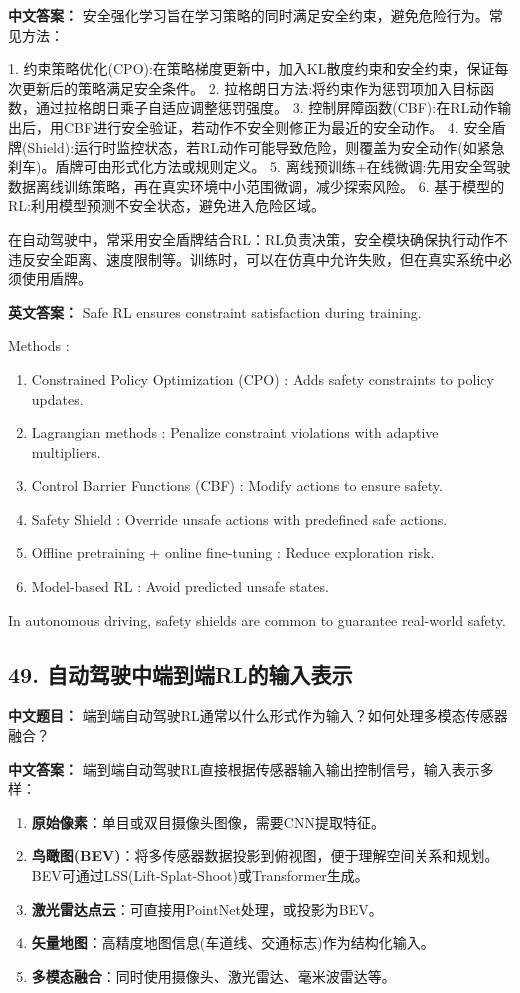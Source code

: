 \documentclass[10pt,a4paper]{ctexart}
\begin{document}
\textbf{中文答案：}  
安全强化学习旨在学习策略的同时满足安全约束，避免危险行为。常见方法：

1.  约束策略优化(CPO):在策略梯度更新中，加入KL散度约束和安全约束，保证每次更新后的策略满足安全条件。
2.  拉格朗日方法:将约束作为惩罚项加入目标函数，通过拉格朗日乘子自适应调整惩罚强度。
3.  控制屏障函数(CBF):在RL动作输出后，用CBF进行安全验证，若动作不安全则修正为最近的安全动作。
4.  安全盾牌(Shield):运行时监控状态，若RL动作可能导致危险，则覆盖为安全动作(如紧急刹车)。盾牌可由形式化方法或规则定义。
5.  离线预训练+在线微调:先用安全驾驶数据离线训练策略，再在真实环境中小范围微调，减少探索风险。
6.  基于模型的RL:利用模型预测不安全状态，避免进入危险区域。

在自动驾驶中，常采用安全盾牌结合RL：RL负责决策，安全模块确保执行动作不违反安全距离、速度限制等。训练时，可以在仿真中允许失败，但在真实系统中必须使用盾牌。

\textbf{英文答案：}  
Safe RL ensures constraint satisfaction during training.

 Methods :
\begin{enumerate}
    \item Constrained Policy Optimization (CPO) : Adds safety constraints to policy updates.
    \item Lagrangian methods : Penalize constraint violations with adaptive multipliers.
    \item Control Barrier Functions (CBF) : Modify actions to ensure safety.
    \item Safety Shield : Override unsafe actions with predefined safe actions.
    \item Offline pretraining + online fine-tuning : Reduce exploration risk.
    \item Model-based RL : Avoid predicted unsafe states.
\end{enumerate}

In autonomous driving, safety shields are common to guarantee real-world safety.

\subsection*{49. 自动驾驶中端到端RL的输入表示}
\textbf{中文题目：} 端到端自动驾驶RL通常以什么形式作为输入？如何处理多模态传感器融合？

\textbf{中文答案：}  
端到端自动驾驶RL直接根据传感器输入输出控制信号，输入表示多样：

\begin{enumerate}
    \item \textbf{原始像素}：单目或双目摄像头图像，需要CNN提取特征。
    \item \textbf{鸟瞰图(BEV)}：将多传感器数据投影到俯视图，便于理解空间关系和规划。BEV可通过LSS(Lift-Splat-Shoot)或Transformer生成。
    \item \textbf{激光雷达点云}：可直接用PointNet处理，或投影为BEV。
    \item \textbf{矢量地图}：高精度地图信息(车道线、交通标志)作为结构化输入。
    \item \textbf{多模态融合}：同时使用摄像头、激光雷达、毫米波雷达等。
\end{enumerate}
\end{document}
